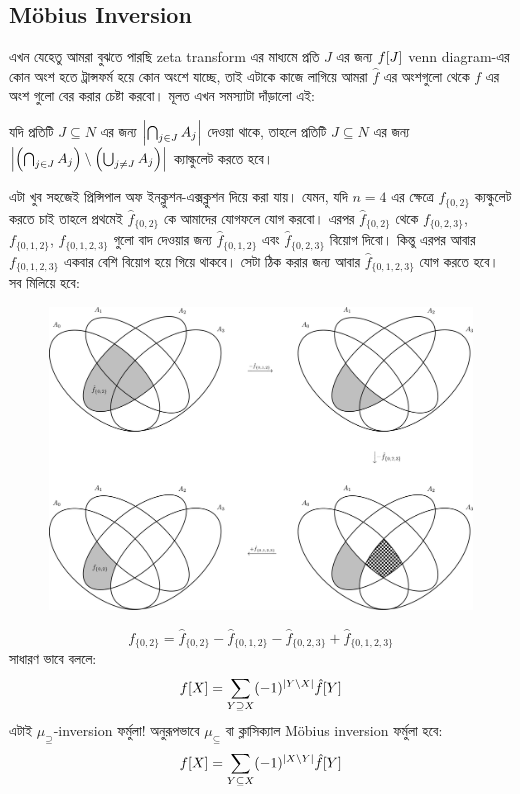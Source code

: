 \subsection{M{\"o}bius Inversion}
এখন যেহেতু আমরা বুঝতে পারছি zeta transform এর মাধ্যমে প্রতি $J$ এর জন্য
$f[J]$ venn diagram-এর কোন অংশ হতে ট্রান্সফর্ম হয়ে কোন অংশে যাচ্ছে, তাই
এটাকে কাজে লাগিয়ে আমরা $\hat{f}$ এর অংশগুলো থেকে $f$ এর অংশ গুলো বের করার
চেষ্টা করবো। মূলত এখন সমস্যাটা দাঁড়ালো এই:
\begin{reducedproblem}
  যদি প্রতিটি $J \subseteq N$ এর জন্য $\left|  \bigcap_{j \in J} A_j  \right|$ দেওয়া
  থাকে, তাহলে প্রতিটি $J \subseteq N$ এর জন্য $\left|  \left ( \bigcap_{j \in J}
  A_j \right ) \setminus \left ( \bigcup_{j \ne J} A_j \right )  \right|$ ক্যাল্কুলেট করতে হবে।
\end{reducedproblem}
এটা খুব সহজেই প্রিন্সিপাল অফ ইনক্লুশন-এক্সক্লুশন দিয়ে করা যায়। যেমন,
যদি $n=4$ এর ক্ষেত্রে $f_{\{0,2\}}$ ক্যল্কুলেট করতে চাই তাহলে প্রথমেই
$\hat{f}_{\{0,2\}}$ কে আমাদের যোগফলে যোগ করবো। এরপর $\hat{f}_{\{0,2\}}$ থেকে
$f_{\{0,2,3\}}$, $f_{\{0,1,2\}}$, $f_{\{0,1,2,3\}}$ গুলো বাদ দেওয়ার জন্য
$\hat{f}_{\{0,1,2\}}$ এবং $\hat{f}_{\{0,2,3\}}$ বিয়োগ দিবো। কিন্তু এরপর আবার
$f_{\{0,1,2,3\}}$ একবার বেশি বিয়োগ হয়ে গিয়ে থাকবে। সেটা ঠিক করার জন্য আবার
$\hat{f}_{\{0,1,2,3\}}$ যোগ করতে হবে। সব মিলিয়ে হবে:
\begin{figure}[!ht]
  \centering
  \includegraphics[width = \textwidth]{./img/sos-dp/4set/inc_exc.pdf}
\end{figure}
\[
  f_{\{0,2\}} = \hat{f}_{\{0,2\}} - \hat{f}_{\{0,1,2\}} - \hat{f}_{\{0,2,3\}}
  + \hat{f}_{\{0,1,2,3\}}
\]
সাধারণ ভাবে বললে:
\[
  f[X] = \sum_{Y \supseteq X} (-1)^{\left| Y \setminus X \right|} \hat{f}[Y]
\]
এটাই $\mu_\supseteq$-inversion ফর্মুলা! অনুরূপভাবে $\mu_\subseteq$ বা
ক্লাসিক্যাল M{\"o}bius inversion ফর্মুলা হবে:
\[
  f[X] = \sum_{Y \subseteq X} (-1)^{\left| X \setminus Y \right|} \hat{f}[Y]
\]

